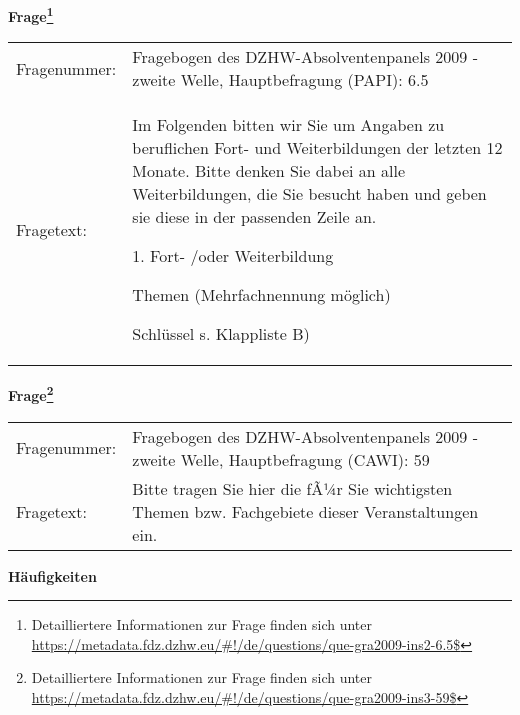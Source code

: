 				\vspace*{0.5cm}
                \noindent\textbf{Frage\footnote{Detailliertere Informationen zur Frage finden sich unter
		              \url{https://metadata.fdz.dzhw.eu/\#!/de/questions/que-gra2009-ins2-6.5$}}}\\
				\begin{tabularx}{\hsize}{@{}lX}
					Fragenummer: &
					  Fragebogen des DZHW-Absolventenpanels 2009 - zweite Welle, Hauptbefragung (PAPI):
					  6.5
 \\
					Fragetext: & Im Folgenden bitten wir Sie um Angaben zu beruflichen Fort- und Weiterbildungen der letzten 12 Monate. Bitte denken Sie dabei an alle Weiterbildungen, die Sie besucht haben und geben sie diese in der passenden Zeile an.\par  1. Fort- /oder Weiterbildung\par  Themen (Mehrfachnennung möglich)\par  Schlüssel s. Klappliste B) \\
				\end{tabularx}
				\vspace*{0.5cm}
                \noindent\textbf{Frage\footnote{Detailliertere Informationen zur Frage finden sich unter
		              \url{https://metadata.fdz.dzhw.eu/\#!/de/questions/que-gra2009-ins3-59$}}}\\
				\begin{tabularx}{\hsize}{@{}lX}
					Fragenummer: &
					  Fragebogen des DZHW-Absolventenpanels 2009 - zweite Welle, Hauptbefragung (CAWI):
					  59
 \\
					Fragetext: & Bitte tragen Sie hier die fÃ¼r Sie wichtigsten Themen bzw. Fachgebiete dieser Veranstaltungen ein. \\
				\end{tabularx}





        		\vspace*{0.5cm}
                \noindent\textbf{Häufigkeiten}

